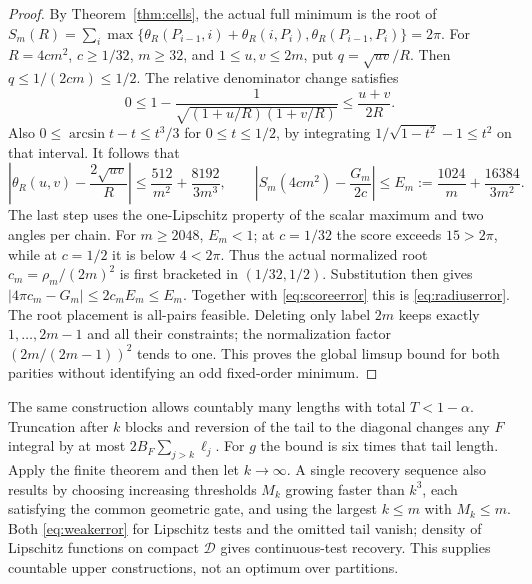 \documentclass[11pt,letterpaper]{article}
\newcommand{\thR}{\theta_R}
\begin{document}
\begin{proof}
By Theorem~\ref{thm:cells}, the actual full minimum is the root of
$S_m(R)=\sum_i\max\{\thR(P_{i-1},i)+\thR(i,P_i),
\thR(P_{i-1},P_i)\}=2\pi$. For $R=4cm^2$, $c\ge1/32$, $m\ge32$,
and $1\le u,v\le2m$, put $q=\sqrt{uv}/R$. Then $q\le1/(2cm)\le1/2$.
The relative denominator change satisfies
\[
 0\le1-\frac1{\sqrt{(1+u/R)(1+v/R)}}\le\frac{u+v}{2R}.
\]
Also $0\le\arcsin t-t\le t^3/3$ for $0\le t\le1/2$,
by integrating $1/\sqrt{1-t^2}-1\le t^2$ on that interval.
It follows that
\[
 \left|\thR(u,v)-\frac{2\sqrt{uv}}R\right|
 \le\frac{512}{m^2}+\frac{8192}{3m^3},\qquad
 \left|S_m(4cm^2)-\frac{G_m}{2c}\right|
 \le E_m:=\frac{1024}m+\frac{16384}{3m^2}.
\]
The last step uses the one-Lipschitz property of the scalar maximum and
two angles per chain. For $m\ge2048$, $E_m<1$; at $c=1/32$ the score
exceeds $15>2\pi$, while at $c=1/2$ it is below $4<2\pi$.
Thus the actual normalized root $c_m=\rho_m/(2m)^2$ is first bracketed
in $(1/32,1/2)$. Substitution then gives
$|4\pi c_m-G_m|\le2c_m E_m\le E_m$.
Together with \eqref{eq:scoreerror} this is \eqref{eq:radiuserror}.
The root placement is all-pairs feasible. Deleting only label $2m$
keeps exactly $1,\ldots,2m-1$ and all their constraints; the normalization
factor $(2m/(2m-1))^2$ tends to one. This proves the global limsup
bound for both parities without identifying an odd fixed-order minimum.
\end{proof}

The same construction allows countably many lengths with total
$T<1-\alpha$. Truncation after $k$ blocks and reversion of the tail to
the diagonal changes any $F$ integral by at most
$2B_F\sum_{j>k}\ell_j$. For $g$ the bound is six times that tail length.
Apply the finite theorem and then let $k\to\infty$. A single recovery
sequence also results by choosing increasing thresholds $M_k$ growing
faster than $k^3$, each satisfying the common geometric gate, and using the largest $k\le m$ with $M_k\le m$.
Both \eqref{eq:weakerror} for Lipschitz tests and the omitted tail vanish;
density of Lipschitz functions on compact $\mathcal D$ gives continuous-test
recovery. This supplies countable upper constructions, not an optimum
over partitions.
\end{document}
